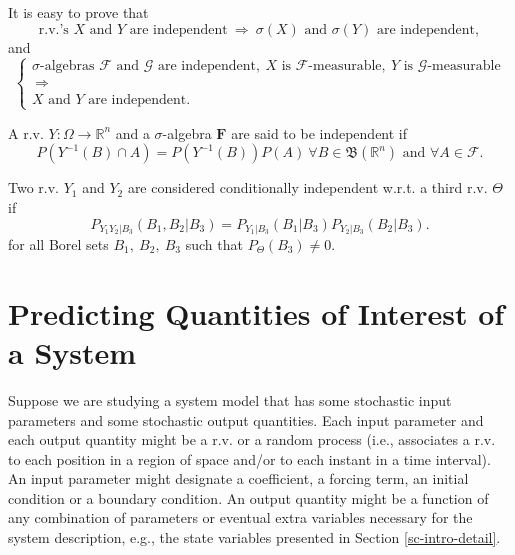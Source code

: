 It is easy to prove that
\begin{equation*}
\text{r.v.'s }X\text{ and }Y\text{ are independent}
~\Rightarrow~
\sigma(X)\text{ and }\sigma(Y)\text{ are independent},
\end{equation*}
and
\begin{equation*}
\left\{
\begin{array}{c}
\sigma\text{-algebras }\mathcal{F}\text{ and }\mathcal{G}\text{ are independent},~X\text{ is }\mathcal{F}\text{-measurable},~Y\text{ is }\mathcal{G}\text{-measurable} \\
~\Rightarrow~ \\
X\text{ and }Y\text{ are independent}.
\end{array}
\right.
\end{equation*}

A r.v. $Y:\Omega\rightarrow\mathbb{R}^n$ and a $\sigma$-algebra $\mathbf{F}$ are said to be independent if
\begin{equation}\label{eq-Y-F-independent}
P(Y^{-1}(B)\cap A) = P(Y^{-1}(B))P(A)~\forall B\in\mathfrak{B}(\mathbb{R}^n)\text{ and }\forall A\in\mathcal{F}.
\end{equation}

Two r.v. $Y_1$ and $Y_2$ are considered conditionally independent w.r.t. a third r.v. $\Theta$ if
\begin{equation*}
P_{Y_1Y_2|B_3}(B_1,B_2|B_3) = P_{Y_1|B_3}(B_1|B_3)P_{Y_2|B_3}(B_2|B_3).
\end{equation*}
for all Borel sets $B_1,~B_2,~B_3$ such that $P_{\Theta}(B_3)\neq 0$.

\section{Predicting Quantities of Interest of a System}\label{sc-intro-qoi}

Suppose we are studying a system model that has
some stochastic input parameters and some stochastic output quantities.
Each input parameter and each output quantity might be a r.v. or a random process
(i.e., associates a r.v. to each position in a region of space and/or to each instant in a time interval).
An input parameter might designate a coefficient, a forcing term, an initial condition or a boundary condition.
An output quantity might be a function of any combination of parameters or eventual extra variables necessary for the system description, e.g.,
the state variables presented in Section \ref{sc-intro-detail}.

